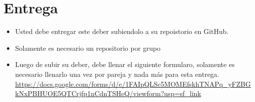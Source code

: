 \documentclass{article}
\begin{document}
\section*{Entrega}

\begin{itemize}
        \item Usted debe entregar este deber subiendolo a su repoistorio en GitHub.
        \item Solamente es necesario un repositorio por grupo
        \item {
                Luego de subir su deber, debe llenar el siguiente formularo, solamente es necesario
                llenarlo una vez por pareja y nada m\'as para esta entrega. \url{https://docs.google.com/forms/d/e/1FAIpQLSc5MOMEfskhTNAPq_yFZBGkNxPBHUOE5QTCrjfp1nCdnTSHeQ/viewform?usp=sf_link}}
\end{itemize}
\end{document}
